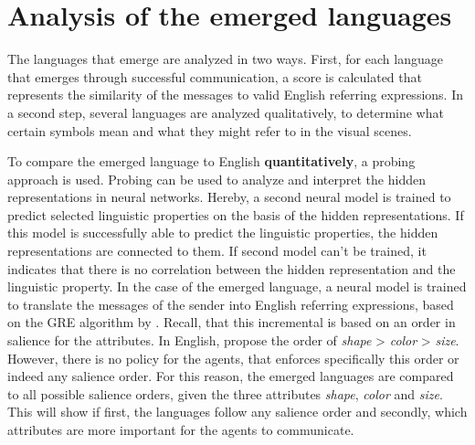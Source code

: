 \section{Analysis of the emerged languages}
\label{sec:analysis_language}
The languages that emerge are analyzed in two ways.
First, for each language that emerges through successful communication, a score is calculated that represents the similarity of the messages to valid English referring expressions.
In a second step, several languages are analyzed qualitatively, to determine what certain symbols mean and what they might refer to in the visual scenes.

To compare the emerged language to English \textbf{quantitatively}, a probing approach is used.
Probing can be used to analyze and interpret the hidden representations in neural networks.
Hereby, a second neural model is trained to predict selected linguistic properties on the basis of the hidden representations.
If this model is successfully able to predict the linguistic properties, the hidden representations are connected to them.
If second model can't be trained, it indicates that there is no correlation between the hidden representation and the linguistic property.
In the case of the emerged language, a neural model is trained to translate the messages of the sender into English referring expressions, based on the GRE algorithm by \citet{Dale1995}.
Recall, that this incremental is based on an order in salience for the attributes.
In English, \citet{Dale1995} propose the order of \emph{shape} > \emph{color} > \emph{size}.
However, there is no policy for the agents, that enforces specifically this order or indeed any salience order.
For this reason, the emerged languages are compared to all possible salience orders, given the three attributes \emph{shape}, \emph{color} and \emph{size}.
This will show if first, the languages follow any salience order and secondly, which attributes are more important for the agents to communicate.

